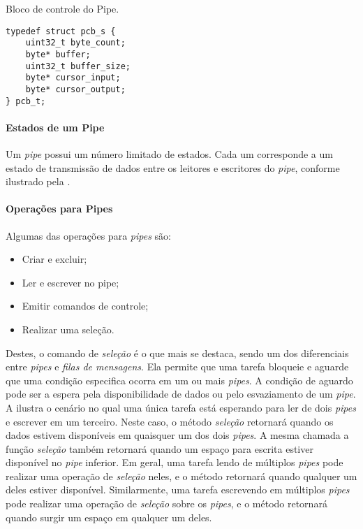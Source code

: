 
\begin{listing}
	\caption{Bloco de controle do Pipe.}
	\label{alg:pipes_pcb}
	\centering
	\begin{verbatim}
typedef struct pcb_s {
	uint32_t byte_count;
	byte* buffer;
	uint32_t buffer_size;
	byte* cursor_input;
	byte* cursor_output;	
} pcb_t;
	\end{verbatim}
\end{listing}

\paragraph{Estados de um Pipe}

Um \emph{pipe} possui um número limitado de estados. Cada um corresponde a um estado de transmissão de dados entre os leitores e escritores do \emph{pipe}, conforme ilustrado pela .


\paragraph{Operações para Pipes}

Algumas das operações para \emph{pipes} são:

\begin{itemize}
	\item Criar e excluir;
	\item Ler e escrever no pipe;
	\item Emitir comandos de controle;
	\item Realizar uma seleção.
\end{itemize}

Destes, o comando de \emph{seleção} é o que mais se destaca, sendo um dos diferenciais entre \emph{pipes} e \emph{filas de mensagens}. Ela permite que uma tarefa bloqueie e aguarde que uma condição especifica ocorra em um ou mais \emph{pipes}. A condição de aguardo pode ser a espera pela disponibilidade de dados ou pelo esvaziamento de um \emph{pipe}. A  ilustra o cenário no qual uma única tarefa está esperando para ler de dois \emph{pipes} e escrever em um terceiro. Neste caso, o método \emph{seleção} retornará quando os dados estivem disponíveis em quaisquer um dos dois \emph{pipes}. A mesma chamada a função \emph{seleção} também retornará quando um espaço para escrita estiver disponível no \emph{pipe} inferior. Em geral, uma tarefa lendo de múltiplos \emph{pipes} pode realizar uma operação de \emph{seleção} neles, e o método retornará quando qualquer um deles estiver disponível. Similarmente, uma tarefa escrevendo em múltiplos \emph{pipes} pode realizar uma operação de \emph{seleção} sobre os \emph{pipes}, e o método retornará quando surgir um espaço em qualquer um deles.

